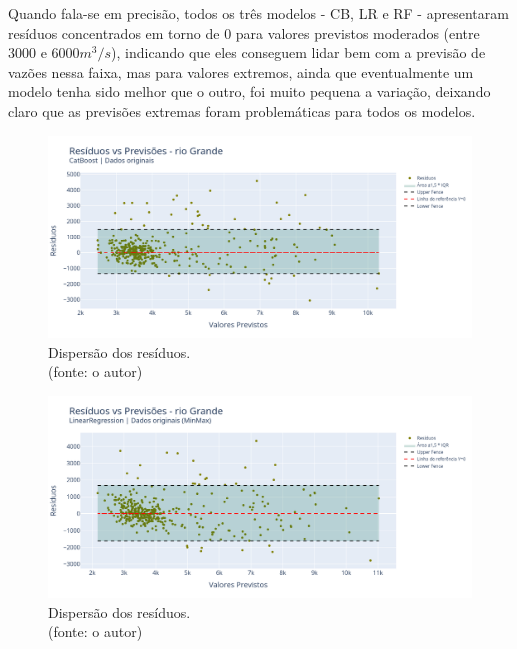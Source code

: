 Quando fala-se em precisão, todos os três modelos - CB, LR e RF - apresentaram resíduos concentrados em torno de $0$ para valores previstos moderados (entre $3000$ e $6000 m^3/s$), indicando que eles conseguem lidar bem com a previsão de vazões nessa faixa, mas para valores extremos, ainda que eventualmente um modelo tenha sido melhor que o outro, foi muito pequena a variação, deixando claro que as previsões extremas foram problemáticas para todos os modelos.

\begin{figure}[!h]
\centering
\includegraphics[scale=0.33]{Figuras/rio_grande/wfv/CB/CB_WFV_ORIG_RESID_x_PREV.png}
\caption{Dispersão dos resíduos.\\(fonte: o autor)}
\label{fig:grande_CB_WFV_ORIG_RESID_x_PREV}
\end{figure}

\begin{figure}[!h]
\centering
\includegraphics[scale=0.33]{Figuras/rio_grande/wfv/LR/LR_WFV_ORIG_RESID_x_PREV.png}
\caption{Dispersão dos resíduos.\\(fonte: o autor)}
\label{fig:grande_LR_WFV_ORIG_RESID_x_PREV}
\end{figure}

